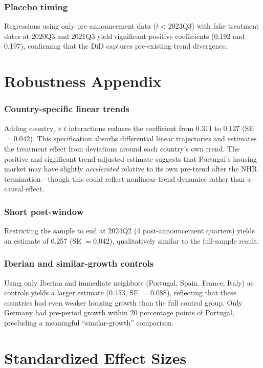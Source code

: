 \documentclass[12pt]{article}
\begin{document}
\subsubsection*{Placebo timing} Regressions using only pre-announcement data ($t < 2023\text{Q3}$) with fake treatment dates at 2020Q3 and 2021Q3 yield significant positive coefficients (0.192 and 0.197), confirming that the DiD captures pre-existing trend divergence.

\section{Robustness Appendix}

\subsubsection*{Country-specific linear trends} Adding $\text{country}_c \times t$ interactions reduces the coefficient from 0.311 to 0.127 (SE $= 0.042$). This specification absorbs differential linear trajectories and estimates the treatment effect from deviations around each country's own trend. The positive and significant trend-adjusted estimate suggests that Portugal's housing market may have slightly \emph{accelerated} relative to its own pre-trend after the NHR termination---though this could reflect nonlinear trend dynamics rather than a causal effect.

\subsubsection*{Short post-window} Restricting the sample to end at 2024Q2 (4 post-announcement quarters) yields an estimate of 0.257 (SE $= 0.042$), qualitatively similar to the full-sample result.

\subsubsection*{Iberian and similar-growth controls} Using only Iberian and immediate neighbors (Portugal, Spain, France, Italy) as controls yields a larger estimate (0.453, SE $= 0.088$), reflecting that these countries had even weaker housing growth than the full control group. Only Germany had pre-period growth within 20 percentage points of Portugal, precluding a meaningful ``similar-growth'' comparison.

\section{Standardized Effect Sizes}
\label{sec:sde}


\end{document}
